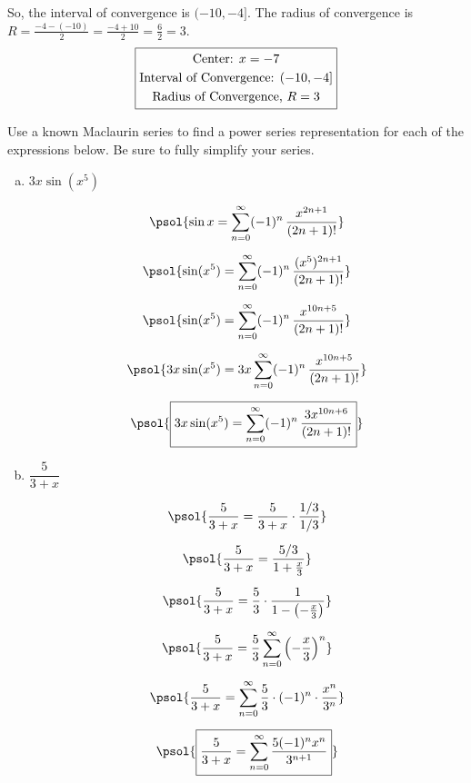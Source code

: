 \documentclass[12pt,letterpaper]{exam}
\begin{document}
\begin{questions}
{So, the interval of convergence is $(-10, -4]$. The radius of convergence is $R= \tfrac{-4 - (-10)}{2}= \tfrac{-4 + 10}{2}= \tfrac{6}{2}= 3$.
	\[
	\boxed{%
	\begin{gathered}
	\text{Center: } x= -7 \\
	\text{Interval of Convergence: } (-10, -4] \\
	\text{Radius of Convergence, } R= 3
	\end{gathered}}
	\]
}



\newpage
\question[16] Use a known Maclaurin series to find a power series representation for each of the expressions below. Be sure to fully simplify your series. \par\vspace{0.2cm}
	\begin{enumerate}[(a)]
	\item $3x \sin(x^5)$ \par\vspace{0.3cm}
		\[
		\begin{gathered}
		\psol{\sin x= \sum_{n=0}^\infty (-1)^n\, \dfrac{x^{2n+1}}{(2n + 1)!}} \\[0.2cm]
		\psol{\sin(x^5)= \sum_{n=0}^\infty (-1)^n\, \dfrac{(x^5)^{2n+1}}{(2n + 1)!}} \\[0.2cm]
		\psol{\sin(x^5)= \sum_{n=0}^\infty (-1)^n\, \dfrac{x^{10n+5}}{(2n + 1)!}} \\[0.2cm]
		\psol{3x \sin(x^5)= 3x \sum_{n=0}^\infty (-1)^n\, \dfrac{x^{10n+5}}{(2n + 1)!}} \\[0.2cm]
		\psol{\boxed{3x \sin(x^5)= \sum_{n=0}^\infty (-1)^n\, \dfrac{3x^{10n+6}}{(2n + 1)!}}} \\
		\end{gathered}
		\] \par\vspace{1.2cm}
	
	\item $\dfrac{5}{3 + x}$ \par\vspace{0.2cm}
		\[
		\begin{gathered}
		\psol{\dfrac{5}{3 + x}= \dfrac{5}{3 + x} \cdot \dfrac{1/3}{1/3}} \\[0.2cm]
		\psol{\dfrac{5}{3 + x}= \dfrac{5/3}{1 + \tfrac{x}{3}}} \\[0.2cm]
		\psol{\dfrac{5}{3 + x}= \dfrac{5}{3} \cdot \dfrac{1}{1 - \left( -\tfrac{x}{3} \right)}} \\[0.2cm]
		\psol{\dfrac{5}{3 + x}= \dfrac{5}{3} \sum_{n=0}^\infty \left( -\dfrac{x}{3} \right)^n} \\[0.2cm]
		\psol{\dfrac{5}{3 + x}= \sum_{n=0}^\infty \dfrac{5}{3} \cdot (-1)^n \cdot \dfrac{x^n}{3^n}} \\[0.2cm]
		\psol{\boxed{\dfrac{5}{3 + x}= \sum_{n=0}^\infty \dfrac{5(-1)^n x^n}{3^{n+1}}}}
		\end{gathered}
		\]
	

\end{enumerate}
\end{questions}
\end{document}

